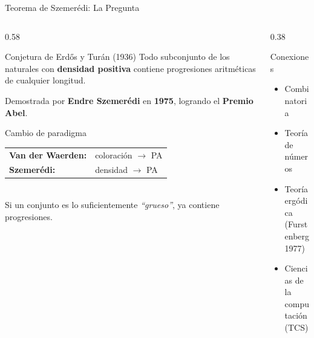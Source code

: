 
\begin{frame}{Teorema de Szemerédi: La Pregunta}

    \begin{columns}[T]

        \begin{column}{0.58\textwidth}
            \begin{block}{Conjetura de Erdős y Turán (1936)}
                Todo subconjunto de los naturales con
                \textbf{densidad positiva} contiene progresiones
                aritméticas de cualquier longitud.
            \end{block}

            \vspace{0.4cm}

            Demostrada por \textbf{Endre Szemerédi} en \textbf{1975},
            logrando el \textbf{Premio Abel}.

            \vspace{0.4cm}

            \begin{exampleblock}{Cambio de paradigma}
                \begin{tabular}{ll}
                    \textbf{Van der Waerden:} & coloración $\to$ PA\\[3pt]
                    \textbf{Szemerédi:} & densidad $\to$ PA
                \end{tabular}\\[4pt]
                Si un conjunto es lo suficientemente \textit{``grueso''},
                ya contiene progresiones.
            \end{exampleblock}
        \end{column}

        \begin{column}{0.38\textwidth}
            \begin{block}{Conexiones}
                \begin{itemize}
                    \item Combinatoria
                    \item Teoría de números
                    \item Teoría ergódica\\
                          {\footnotesize (Furstenberg 1977)}
                    \item Ciencias de la\\
                          computación (TCS)
                \end{itemize}
            \end{block}
        \end{column}

    \end{columns}

\end{frame}


